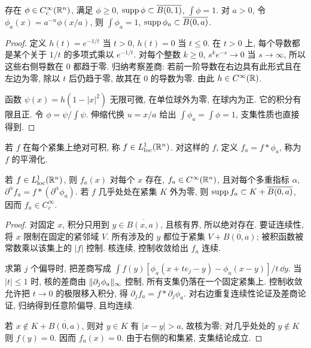 \begin{lemma}[光滑紧支集核]\label{ra:c7:bump}
存在 $\phi\in C_c^\infty(\mathbb R^n)$, 满足 $\phi\ge0$, $\operatorname{supp}\phi\subset\overline{B(0,1)}$, $\int\phi=1$. 对 $a>0$, 令 $\phi_a(x)=a^{-n}\phi(x/a)$, 则 $\int\phi_a=1$, $\operatorname{supp}\phi_a\subset\overline{B(0,a)}$.
\end{lemma}
\begin{proof}
定义 $h(t)=e^{-1/t}$ 当 $t>0$, $h(t)=0$ 当 $t\le0$. 在 $t>0$ 上, 每个导数都是某个关于 $1/t$ 的多项式乘以 $e^{-1/t}$. 对每个整数 $k\ge0$, $s^ke^{-s}\to0$ 当 $s\to\infty$, 所以这些右侧导数在 $0$ 都趋于零. 归纳考察差商: 若前一阶导数在右边具有此形式且在左边为零, 除以 $t$ 后仍趋于零, 故其在 $0$ 的导数为零. 由此 $h\in C^\infty(\mathbb R)$.

函数 $\psi(x)=h(1-|x|^2)$ 无限可微, 在单位球外为零, 在球内为正. 它的积分有限且正. 令 $\phi=\psi/\int\psi$. 伸缩代换 $u=x/a$ 给出 $\int\phi_a=\int\phi=1$, 支集性质也直接得到.
\end{proof}

\begin{definition}[局部可积与平滑化]
若 $f$ 在每个紧集上绝对可积, 称 $f\in L^1_{\mathrm{loc}}(\mathbb R^n)$. 对这样的 $f$, 定义 $f_a=f*\phi_a$, 称为 $f$ 的平滑化.
\end{definition}

\begin{theorem}[平滑化的导数与支集]\label{ra:c7:mollify}
若 $f\in L^1_{\mathrm{loc}}(\mathbb R^n)$, 则 $f_a(x)$ 对每个 $x$ 存在, $f_a\in C^\infty(\mathbb R^n)$, 且对每个多重指标 $\alpha$,
$\partial^\alpha f_a=f*(\partial^\alpha\phi_a)$.
若 $f$ 几乎处处在紧集 $K$ 外为零, 则 $\operatorname{supp} f_a\subset K+\overline{B(0,a)}$, 因而 $f_a\in C_c^\infty$.
\end{theorem}
\begin{proof}
对固定 $x$, 积分只用到 $y\in\overline{B(x,a)}$, 且核有界, 所以绝对存在. 要证连续性, 将 $x$ 限制在固定的紧邻域 $V$. 所有涉及的 $y$ 都位于紧集 $V+\overline{B(0,a)}$; 被积函数被常数乘以该集上的 $|f|$ 控制. 核连续, 控制收敛给出 $f_a$ 连续.

求第 $j$ 个偏导时, 把差商写成
$\int f(y)[\phi_a(x+te_j-y)-\phi_a(x-y)]/t\,\dd y$.
当 $|t|\le1$ 时, 核的差商由 $\lVert \partial_j\phi_a\rVert_\infty$ 控制, 所有支集仍落在一个固定紧集上. 控制收敛允许把 $t\to0$ 的极限移入积分, 得 $\partial_jf_a=f*\partial_j\phi_a$. 对右边重复连续性论证及差商论证, 归纳得到任意阶偏导, 且均连续.

若 $x\notin K+\overline{B(0,a)}$, 则对 $y\in K$ 有 $|x-y|>a$, 故核为零; 对几乎处处的 $y\notin K$ 则 $f(y)=0$. 因而 $f_a(x)=0$. 由于右侧的和集紧, 支集结论成立.
\end{proof}

